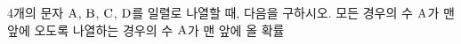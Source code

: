 4개의 문자 $\mathrm{A}$, $\mathrm{B}$, $\mathrm{C}$, $\mathrm{D}$를 일렬로 나열할 때, 다음을 구하시오.
 모든 경우의 수
 $\mathrm{A}$가 맨 앞에 오도록 나열하는 경우의 수
 $\mathrm{A}$가 맨 앞에 올 확률
